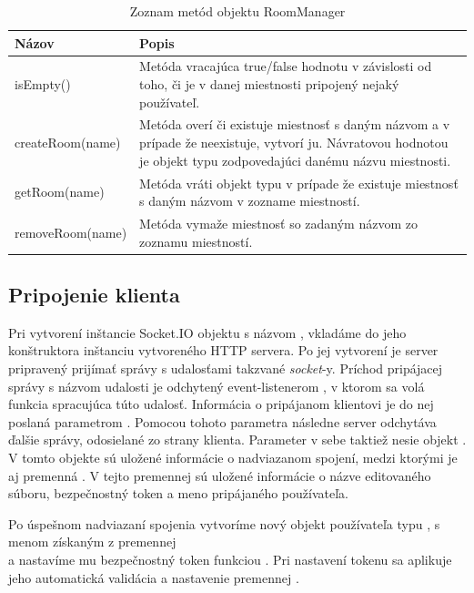 \begin{table}
	\begin{tabular}{ | m{4cm} | m{8.5cm} | } \hline
		\textbf{Názov} & \textbf{Popis} \\ \hline \hline
		
		isEmpty() & Metóda vracajúca true/false hodnotu v závislosti od toho, či je v danej miestnosti pripojený nejaký používateľ. \\\hline
		createRoom(name) & Metóda overí či existuje miestnosť s daným názvom a v prípade že neexistuje, vytvorí ju. Návratovou hodnotou je objekt typu \code{Room} zodpovedajúci danému názvu miestnosti. \\\hline
		getRoom(name) & Metóda vráti objekt typu \code{Room} v prípade že existuje miestnosť s daným názvom v zozname miestností. \\\hline
		removeRoom(name) & Metóda vymaže miestnosť so zadaným názvom zo zoznamu miestností. \\\hline
		
		\hline
	\end{tabular}
	\caption{Zoznam metód objektu RoomManager}
	\label{tab:server-func-roommanager}
\end{table}
\FloatBarrier

\subsection{Pripojenie klienta}

Pri vytvorení inštancie Socket.IO objektu s názvom , vkladáme do jeho konštruktora inštanciu vytvoreného HTTP servera. Po jej vytvorení je server pripravený prijímať správy s udalosťami takzvané \textit{socket}-y. Príchod pripájacej správy s názvom udalosti   je odchytený event-listenerom  , v ktorom sa volá funkcia spracujúca túto udalosť. Informácia o pripájanom klientovi je do nej poslaná parametrom . Pomocou tohoto parametra následne server odchytáva ďalšie správy, odosielané zo strany klienta. Parameter v sebe taktiež nesie objekt . V tomto objekte sú uložené informácie o nadviazanom spojení, medzi ktorými je aj premenná . V tejto premennej sú uložené informácie o názve editovaného súboru, bezpečnostný token a meno pripájaného používateľa. 

Po úspešnom nadviazaní spojenia vytvoríme nový objekt používateľa typu , s menom získaným z premennej \\ a nastavíme mu bezpečnostný token funkciou . Pri nastavení tokenu sa aplikuje jeho automatická validácia a nastavenie premennej .



